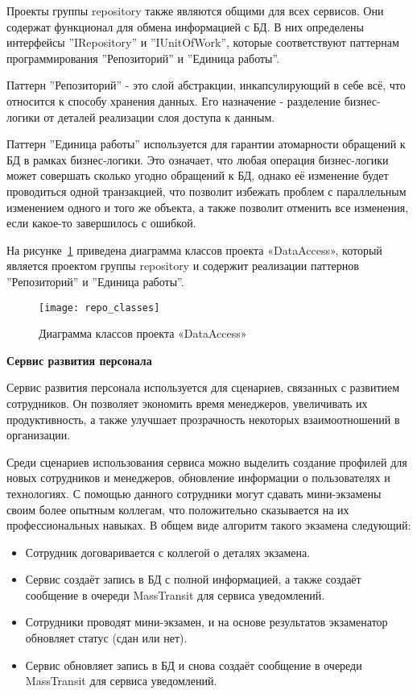 Проекты группы repository также являются общими для всех сервисов. Они содержат функционал для обмена информацией с БД. В них определены интерфейсы ''IRepository'' и ''IUnitOfWork'', которые соответствуют паттернам программирования ''Репозиторий'' и ''Единица работы''.

Паттерн ''Репозиторий'' - это слой абстракции, инкапсулирующий в себе всё, что относится к способу хранения данных. Его назначение - разделение бизнес-логики от деталей реализации слоя доступа к данным.

Паттерн ''Единица работы'' используется для гарантии атомарности обращений к БД в рамках бизнес-логики. Это означает, что любая операция бизнес-логики может совершать сколько угодно обращений к БД, однако её изменение будет проводиться одной транзакцией, что позволит избежать проблем с параллельным изменением одного и того же объекта, а также позволит отменить все изменения, если какое-то завершилось с ошибкой.

На рисунке~\ref{fig:repo_classes} приведена диаграмма классов проекта «DataAccess», который является проектом группы repository и содержит реализации паттернов ''Репозиторий'' и ''Единица работы''. 

\begin{figure}[ht]
    \centering
    \texttt{[image: repo\_classes]}
    \caption{Диаграмма классов проекта «DataAccess»}\label{fig:repo_classes}
\end{figure}

\bigskip
\textbf{Сервис развития персонала}

Сервис развития персонала используется для сценариев, связанных с развитием сотрудников. Он позволяет экономить время менеджеров, увеличивать их продуктивность, а также улучшает прозрачность некоторых взаимоотношений в организации.

Среди сценариев использования сервиса можно выделить создание профилей для новых сотрудников и менеджеров, обновление информации о пользователях и технологиях. С помощью данного сотрудники могут сдавать мини-экзамены своим более опытным коллегам, что положительно сказывается на их профессиональных навыках. В общем виде алгоритм такого экзамена следующий:

\begin{itemize}
    \item Сотрудник договаривается с коллегой о деталях экзамена.
    \item Сервис создаёт запись в БД с полной информацией, а также создаёт сообщение в очереди MassTransit для сервиса уведомлений.
    \item Сотрудники проводят мини-экзамен, и на основе результатов экзаменатор обновляет статус (сдан или нет).
    \item Сервис обновляет запись в БД и снова создаёт сообщение в очереди MassTransit для сервиса уведомлений.
\end{itemize}

